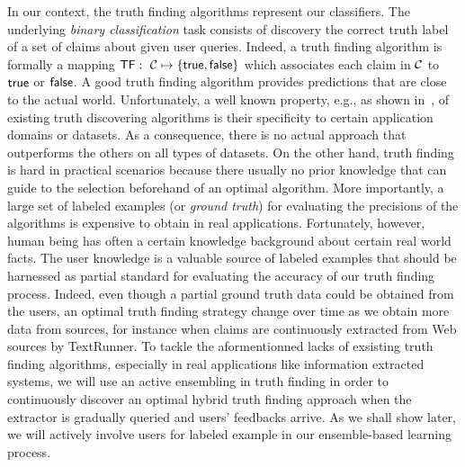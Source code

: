 In our context, the truth finding algorithms represent our classifiers. The underlying \emph{binary classification} 
task consists of discovery the correct truth label of a set of claims about given user queries. Indeed, a truth finding 
algorithm is formally a mapping $\textsf{TF}:~\mathcal{C} \mapsto \{\mathsf{true}, \mathsf{false}\}$ which associates each claim in $\mathcal{C}$
to $\mathsf{true}$ or $\mathsf{false}$. A good truth finding algorithm provides  predictions that are close to the actual world.
Unfortunately, a well known property, e.g., as shown in~\cite{Li12, Wagui14}, of existing truth discovering algorithms is their specificity
to certain application domains or datasets. As a consequence, there is no actual approach that outperforms the others on all types of datasets. On the other hand,
truth finding is hard in practical scenarios because there usually no prior knowledge that can guide to the selection beforehand of an optimal algorithm. More
importantly, a large set of labeled examples (or \emph{ground truth}) for evaluating the precisions of the algorithms is expensive to obtain in real applications. 
Fortunately, however, human being has often a certain knowledge background about certain real world facts. The user knowledge is a valuable source of labeled examples
that should be harnessed as partial standard for evaluating the accuracy of our truth finding process. Indeed, even though a partial ground truth data could be obtained from the users, an 
optimal truth finding strategy change over time as we obtain more data from sources, for instance when claims are continuously extracted from Web sources by TextRunner. 
To tackle the aformentionned lacks of exsisting truth finding algorithms, especially in real applications like information extracted systems, we will use an active ensembling
in truth finding in order to continuously discover an optimal hybrid truth finding approach when the extractor is gradually queried and users' feedbacks arrive. As we shall 
show later, we will actively involve users for labeled example in our ensemble-based learning process.

